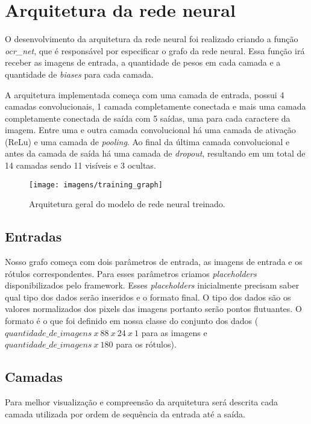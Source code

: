 \section{Arquitetura da rede neural}

O desenvolvimento da arquitetura da rede neural foi realizado criando
a função \textit{ocr\_net}, que é responsável por especificar o grafo
da rede neural. Essa função irá receber as imagens de entrada, a
quantidade de pesos em cada camada e a quantidade de \textit{biases}
para cada camada.

A arquitetura implementada começa com uma camada de entrada, possui 4
camadas convolucionais, 1 camada completamente conectada e mais uma
camada completamente conectada de saída com 5 saídas, uma para cada
caractere da imagem. Entre uma e outra camada convolucional há uma
camada de ativação (ReLu) e uma camada de \textit{pooling}. Ao final
da última camada convolucional e antes da camada de saída há uma
camada de \textit{dropout}, resultando em um total de 14 camadas sendo
11 visíveis e 3 ocultas.

\begin{figure}[H]
\centering
\texttt{[image: imagens/training\_graph]}
\caption{Arquitetura geral do modelo de rede neural treinado.}
\label{fig:training_graph}
\end{figure}

\subsection{Entradas}

Nosso grafo começa com dois parâmetros de entrada, as imagens de
entrada e os rótulos correspondentes. Para esses parâmetros criamos
\textit{placeholders} disponibilizados pelo framework. Esses
\textit{placeholders} inicialmente precisam saber qual tipo dos dados
serão inseridos e o formato final. O tipo dos dados são os valores
normalizados dos pixels das imagens portanto serão pontos
flutuantes. O formato é o que foi definido em nossa classe do conjunto
dos dados ($quantidade\_de\_imagens\ x\ 88\ x\ 24\ x\ 1$ para as
imagens e $quantidade\_de\_imagens\ x\ 180$ para os rótulos).

\subsection{Camadas}

Para melhor visualização e compreensão da arquitetura será descrita
cada camada utilizada por ordem de sequência da entrada até a saída.

